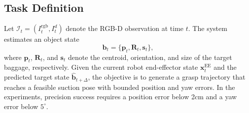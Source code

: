 \subsection{Task Definition}
Let $\mathcal{I}_{t}=(I_{t}^{\text{rgb}},I_{t}^{d})$ denote the RGB-D observation at time $t$. The system estimates an object state
\begin{equation}
\boldsymbol{b}_{t}=\{\boldsymbol{p}_{t},\boldsymbol{R}_{t},\boldsymbol{s}_{t}\},
\end{equation}
where $\boldsymbol{p}_{t}$, $\boldsymbol{R}_{t}$, and $\boldsymbol{s}_{t}$ denote the centroid, orientation, and size of the target baggage, respectively. Given the current robot end-effector state $\boldsymbol{x}^{\text{EE}}_{t}$ and the predicted target state $\widehat{\boldsymbol{b}}_{t+\Delta}$, the objective is to generate a grasp trajectory that reaches a feasible suction pose with bounded position and yaw errors. In the experiments, precision success requires a position error below 2$\mathrm{cm}$ and a yaw error below $5^{\circ}$.